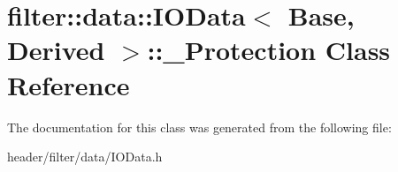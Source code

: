 \hypertarget{classfilter_1_1data_1_1_i_o_data_1_1___protection}{}\section{filter\+:\+:data\+:\+:I\+O\+Data$<$ Base, Derived $>$\+:\+:\+\_\+\+Protection Class Reference}
\label{classfilter_1_1data_1_1_i_o_data_1_1___protection}


The documentation for this class was generated from the following file\+:\begin{DoxyCompactItemize}
\item 
header/filter/data/I\+O\+Data.\+h\end{DoxyCompactItemize}
